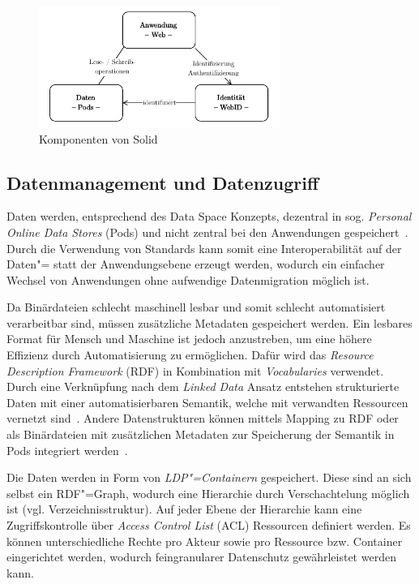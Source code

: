 \begin{figure}[b]
    \includegraphics[width=0.7\textwidth]{./assets/solid_triangle.drawio.pdf}
    \caption{Komponenten von Solid}
    \label{fig:solid-components}
\end{figure}


\subsection{Datenmanagement und Datenzugriff}

Daten werden, entsprechend des Data Space Konzepts, dezentral in sog. \emph{Personal Online Data Stores} (Pods) und nicht zentral bei den Anwendungen gespeichert~\cite{mecklerWebLinkedData2023}.
Durch die Verwendung von Standards kann somit eine Interoperabilität auf der Daten"= statt der Anwendungsebene erzeugt werden, wodurch ein einfacher Wechsel von Anwendungen ohne aufwendige Datenmigration möglich ist.

Da Binärdateien schlecht maschinell lesbar und somit schlecht automatisiert verarbeitbar sind, müssen zusätzliche Metadaten gespeichert werden.
Ein lesbares Format für Mensch und Maschine ist jedoch anzustreben, um eine höhere Effizienz durch Automatisierung zu ermöglichen.
Dafür wird das \emph{Resource Description Framework} (RDF) in Kombination mit \emph{Vocabularies} verwendet.
Durch eine Verknüpfung nach dem \emph{Linked Data} Ansatz entstehen strukturierte Daten mit einer automatisierbaren Semantik, welche mit verwandten Ressourcen vernetzt sind~\cite{bizerLinkedDataStory2009,mecklerWebLinkedData2023,sambraSolidPlatformDecentralized2016}.
Andere Datenstrukturen können mittels Mapping zu RDF oder als Binärdateien mit zusätzlichen Metadaten zur Speicherung der Semantik in Pods integriert werden~\cite{mecklerWebLinkedData2023,sambraSolidPlatformDecentralized2016}.

Die Daten werden in Form von \emph{LDP"=Containern} gespeichert.
Diese sind an sich selbst ein RDF"=Graph, wodurch eine Hierarchie durch Verschachtelung möglich ist (vgl. Verzeichnisstruktur).
Auf jeder Ebene der Hierarchie kann eine Zugriffskontrolle über \emph{Access Control List} (ACL) Ressourcen definiert werden.
Es können unterschiedliche Rechte pro Akteur sowie pro Ressource bzw. Container eingerichtet werden, wodurch feingranularer Datenschutz gewährleistet werden kann.

